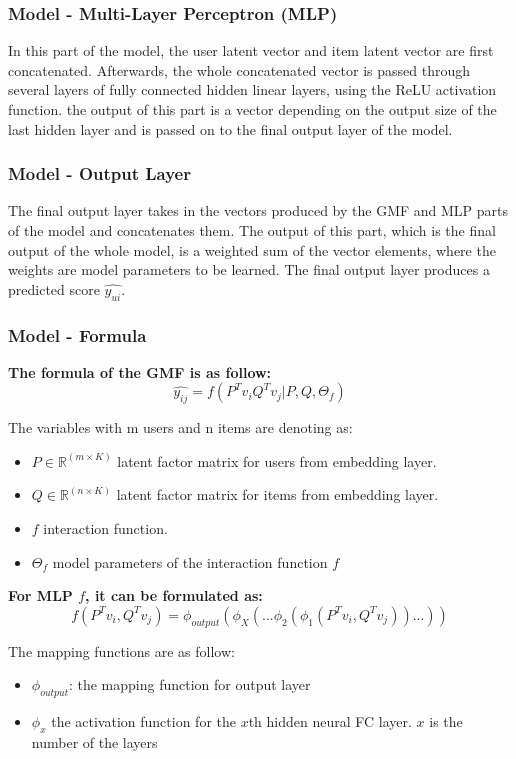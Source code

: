 \documentclass[final]{cvpr}
\begin{document}
\subsubsection{Model - Multi-Layer Perceptron (MLP)}

In this part of the model, the user latent vector and item latent vector are first concatenated. Afterwards, the whole concatenated vector is passed through several layers of fully connected hidden linear layers, using the ReLU activation function. the output of this part is a vector depending on the output size of the last hidden layer and is passed on to the final output layer of the model.

\subsubsection{Model - Output Layer}

The final output layer takes in the vectors produced by the GMF and MLP parts of the model and concatenates them. The output of this part, which is the final output of the whole model, is a weighted sum of the vector elements, where the weights are model parameters to be learned. The final output layer produces a predicted score $\hat{y_{ui}}$.

\subsubsection{Model - Formula}
\bigskip
\textbf{ The formula of the GMF is as follow:}
$$\hat{y_{ij}} = f(P^T v_i Q^T v_j|P,Q,\Theta_f)$$

The variables with m users and n items are denoting as:
\begin{itemize}
    \item $P \in \mathbb{R}^{(m \times K)}$ latent factor matrix for users from embedding layer.
    \item $Q \in \mathbb{R} ^{(n \times K)}$ latent factor matrix for items from embedding layer.
    \item $f$ interaction function.    
    \item $\Theta_{f}$ model parameters of the interaction function $f$
\end{itemize}

\bigskip
\textbf{ For MLP $f$, it can be formulated as:}
$$f(P^T v_i, Q^T v_j) = \phi_{output}(\phi_X(...\phi_2(\phi_1(P^T v_i, Q^T v_j))...))$$

The mapping functions are as follow:
\begin{itemize}
    \item $\phi_{output}$: the mapping function for output layer
    \item $\phi_x$ the activation function for the $x$th hidden neural FC layer. $x$ is the number of the layers
\end{itemize}
\end{document}
